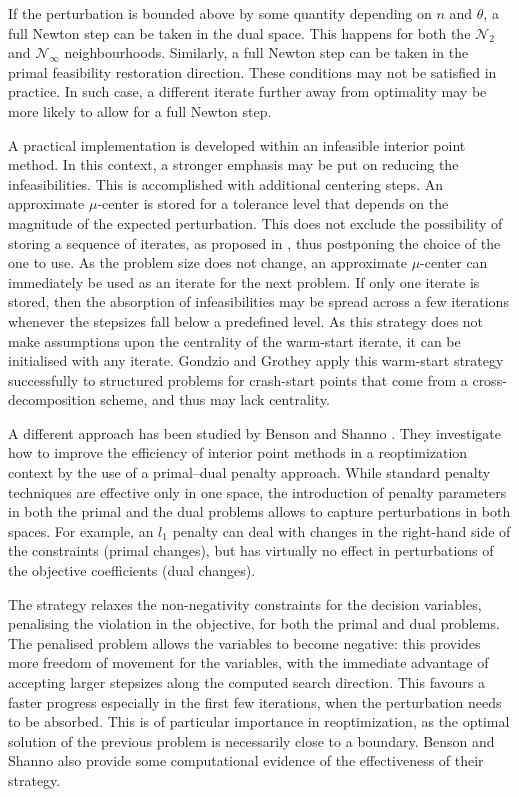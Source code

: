 If the perturbation is bounded above by some quantity depending 
on $n$ and $\theta$, a full Newton step can be taken in the dual space. 
This happens for both the $\mathcal{N}_2$ and $\mathcal{N}_\infty$ 
neighbourhoods. Similarly, a full Newton step can be taken in the 
primal feasibility restoration direction. These conditions may not 
be satisfied in practice. In such case, a different iterate further 
away from optimality may be more likely to allow for a full Newton step.

A practical implementation is developed within an infeasible interior 
point method. In this context, a stronger emphasis may be put on 
reducing the infeasibilities. This is accomplished with additional 
centering steps.
An approximate $\mu$-center is stored for a tolerance level that 
depends on the magnitude of the expected perturbation. This does not 
exclude the possibility of storing a sequence of iterates, as proposed 
in \cite{YildirimWright}, thus postponing the choice of the one to 
use.
As the problem size does not change, an approximate $\mu$-center 
can immediately be used as an iterate for the next problem.
If only one iterate is stored, then the absorption of infeasibilities 
may be spread across a few iterations whenever the stepsizes fall 
below a predefined level.
As this strategy does not make assumptions upon the centrality of the 
warm-start iterate,
it can be initialised with any iterate.
Gondzio and Grothey \cite{GondzioGrothey03} apply this warm-start 
strategy successfully to structured problems for crash-start points that 
come from a cross-decomposition scheme, and thus may lack centrality.

A different approach has been studied by Benson and Shanno 
\cite{BensonShanno}. They investigate how to improve the efficiency 
of interior point methods in a reoptimization context by the use of 
a primal--dual penalty approach.
While standard penalty techniques are effective only in one space, 
the introduction of penalty parameters in both the primal and the 
dual problems allows to capture perturbations in both spaces.
%
For example, an $l_1$ penalty can deal with changes in the right-hand
side of the constraints (primal changes), but has virtually no effect
in perturbations of the objective coefficients (dual changes).

The strategy relaxes the non-negativity constraints for the decision
variables, penalising the violation in the objective, for both
the primal and dual problems.
The penalised problem allows the variables to become negative: 
this provides more freedom of movement for the variables, with
the immediate advantage of accepting larger stepsizes along 
the computed search direction. This favours a faster progress
especially in the first few iterations, when the perturbation needs
to be absorbed.
This is of particular importance in reoptimization, as the optimal
solution of the previous problem is necessarily close to a boundary.
%
Benson and Shanno \cite{BensonShanno} also provide some computational
evidence of the effectiveness of their strategy.

